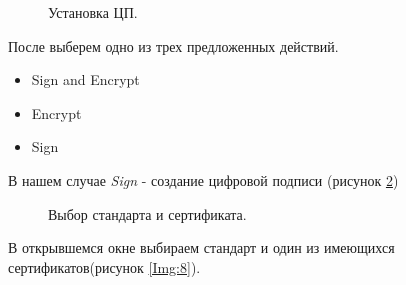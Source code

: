 \documentclass[10pt,a4paper]{report}
\begin{document}
		\begin{figure}[h]
			\caption{Установка ЦП.}
			\label{Img:6}
		\end{figure}
	
	После выберем одно из трех предложенных действий.
	\begin{itemize}
		\item Sign and Encrypt
		\item Encrypt
		\item Sign
	\end{itemize} 
	В нашем случае \textit{Sign} - создание цифровой подписи (рисунок \ref{Img:7})
			
		\begin{figure}[h]
			\caption{Выбор стандарта и сертификата.}
			\label{Img:7}
		\end{figure}
			
	В открывшемся окне выбираем стандарт и один из имеющихся сертификатов(рисунок \ref{Img:8}).
	
\end{document}
